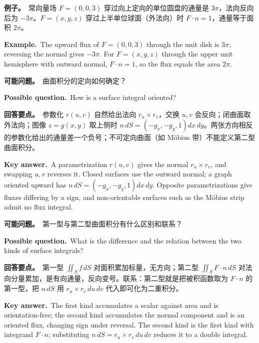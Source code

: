 \documentclass[UTF8,11pt,a4paper]{ctexart}
\newcommand{\EX}[2]{\par\noindent\textbf{例子。}\ #1\par\noindent\textbf{Example.}\ #2\par}
\newcommand{\ASK}[4]{\begin{samepage}\par\noindent\textbf{可能问题。}\ #1\par\noindent\textbf{Possible question.}\ #2\par\noindent\textbf{回答要点。}\ #3\par\noindent\textbf{Key answer.}\ #4\medskip\end{samepage}}
\begin{document}
\EX{常向量场 $F=(0,0,3)$ 穿过向上定向的单位圆盘的通量是 $3\pi$，法向反向后为 $-3\pi$。$F=(x,y,z)$ 穿过上半单位球面（外法向）时 $F\cdot n=1$，通量等于面积 $2\pi$。}{The upward flux of $F=(0,0,3)$ through the unit disk is $3\pi$; reversing the normal gives $-3\pi$. For $F=(x,y,z)$ through the upper unit hemisphere with outward normal, $F\cdot n=1$, so the flux equals the area $2\pi$.}
\ASK{曲面积分的定向如何确定？}{How is a surface integral oriented?}{参数化 $r(u,v)$ 自然给出法向 $r_u\times r_v$，交换 $u,v$ 会反向；闭曲面取外法向；图像 $z=g(x,y)$ 取上侧时 $n\,dS=(-g_x,-g_y,1)dx\,dy$。两张方向相反的参数化给出的通量差一个负号；不可定向曲面（如 Möbius 带）不能定义第二型曲面积分。}{A parametrization $r(u,v)$ gives the normal $r_u\times r_v$, and swapping $u,v$ reverses it. Closed surfaces use the outward normal; a graph oriented upward has $n\,dS=(-g_x,-g_y,1)dx\,dy$. Opposite parametrizations give fluxes differing by a sign, and non-orientable surfaces such as the Möbius strip admit no flux integral.}
\ASK{第一型与第二型曲面积分有什么区别和联系？}{What is the difference and the relation between the two kinds of surface integrals?}{第一型 $\iint_Sf\,dS$ 对面积累加标量，无方向；第二型 $\iint_SF\cdot n\,dS$ 对法向分量累加，是有向通量，反向变号。联系：第二型就是把被积函数取为 $F\cdot n$ 的第一型，把 $n\,dS$ 用 $r_u\times r_v\,du\,dv$ 代入即可化为二重积分。}{The first kind accumulates a scalar against area and is orientation-free; the second kind accumulates the normal component and is an oriented flux, changing sign under reversal. The second kind is the first kind with integrand $F\cdot n$; substituting $n\,dS=r_u\times r_v\,du\,dv$ reduces it to a double integral.}
\end{document}
